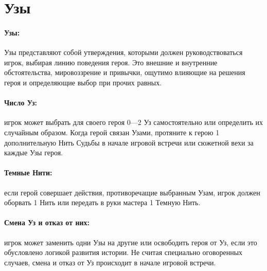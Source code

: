 \section{Узы}
\paragraph{Узы:} Узы представляют собой утверждения, которыми должен руководствоваться игрок, выбирая линию поведения героя. Это внешние и внутренние обстоятельства, мировоззрение и привычки, ощутимо влияющие на решения героя и определяющие выбор при прочих равных.
\paragraph{Число Уз:} игрок может выбрать для своего героя 0—2 Уз самостоятельно или определить их случайным образом. Когда герой связан Узами, протяните к герою 1 дополнительную Нить Судьбы в начале игровой встречи или сюжетной вехи за каждые Узы героя.
\paragraph{Темные Нити:} если герой совершает действия, противоречащие выбранным Узам, игрок должен оборвать 1 Нить или передать в руки мастера 1 Темную Нить.
\paragraph{Смена Уз и отказ от них:} игрок может заменить одни Узы на другие или освободить героя от Уз, если это обусловлено логикой развития истории. Не считая специально оговоренных случаев, смена и отказ от Уз происходит в начале игровой встречи.
